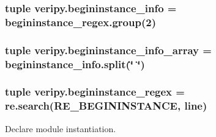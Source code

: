 \hypertarget{namespaceveripy_a0a3f7bc90b80f1eccaf884f40317af5c}{
\subsubsection[{begininstance\-\_\-info}]{\setlength{\rightskip}{0pt plus 5cm}tuple veripy.\-begininstance\-\_\-info = begininstance\-\_\-regex.\-group(2)}}\label{namespaceveripy_a0a3f7bc90b80f1eccaf884f40317af5c}
\hypertarget{namespaceveripy_a7b3d5c606eddfcb4f4e7e1d6c01fac6b}{
\subsubsection[{begininstance\-\_\-info\-\_\-array}]{\setlength{\rightskip}{0pt plus 5cm}tuple veripy.\-begininstance\-\_\-info\-\_\-array = begininstance\-\_\-info.\-split(\char`\"{} \char`\"{})}}\label{namespaceveripy_a7b3d5c606eddfcb4f4e7e1d6c01fac6b}
\hypertarget{namespaceveripy_ae4bac0ac3bb653fb2c6ccacc770d05f6}{
\subsubsection[{begininstance\-\_\-regex}]{\setlength{\rightskip}{0pt plus 5cm}tuple veripy.\-begininstance\-\_\-regex = re.\-search(R\-E\-\_\-\-B\-E\-G\-I\-N\-I\-N\-S\-T\-A\-N\-C\-E, {\bf line})}}\label{namespaceveripy_ae4bac0ac3bb653fb2c6ccacc770d05f6}


Declare module instantiation. 

